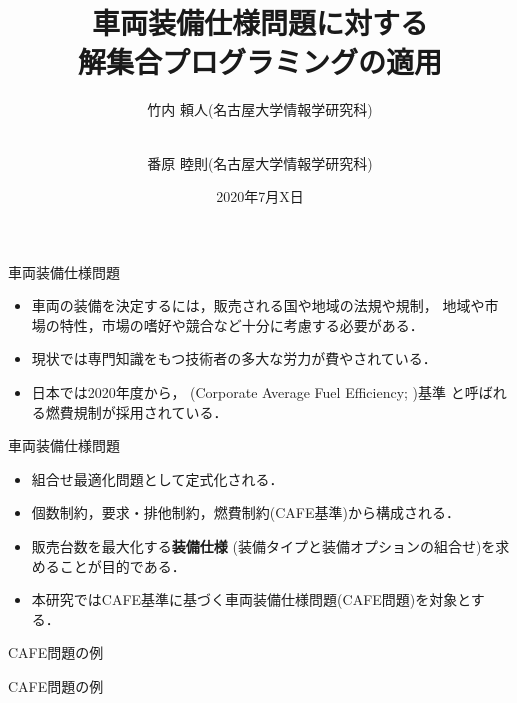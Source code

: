 \documentclass[dvipdfmx, 11pt,]{beamer}
\title{車両装備仕様問題に対する\\解集合プログラミングの適用}
\author{竹内 頼人(名古屋大学情報学研究科) \and \\ 番原 睦則(名古屋大学情報学研究科)}
\date{2020年7月X日}
\begin{document}
\begin{frame}
 \titlepage
\end{frame}
\begin{frame}{車両装備仕様問題}
  \begin{itemize}
  \item 車両の装備を決定するには，販売される国や地域の法規や規制，
    地域や市場の特性，市場の嗜好や競合など十分に考慮する必要がある．
  \item 現状では専門知識をもつ技術者の多大な労力が費やされている．
  \item 日本では2020年度から，
    (Corporate Average Fuel Efficiency; )基準
    と呼ばれる燃費規制が採用されている．
  \end{itemize}
  \vfill
  \begin{alertblock}{車両装備仕様問題}
    \begin{itemize}
    \item 組合せ最適化問題として定式化される．
    \item \alert{個数制約}，\alert{要求・排他制約}，\alert{燃費制約}(CAFE基準)から構成される．
    \item \alert{販売台数を最大化}する\textbf{装備仕様}
      (装備タイプと装備オプションの組合せ)を求めることが目的である．
    \end{itemize}
  \end{alertblock}
 \begin{itemize}
  \item 本研究ではCAFE基準に基づく車両装備仕様問題(CAFE問題)を対象とする．
 \end{itemize}
\end{frame}
\begin{frame}{CAFE問題の例}
 
\end{frame}
\begin{frame}{CAFE問題の例}
 
\end{frame}
\end{document}
